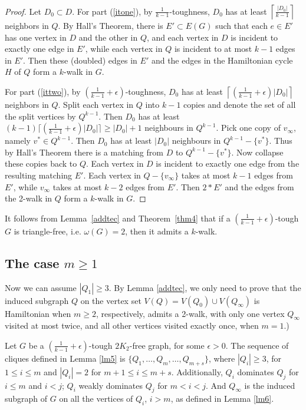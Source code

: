 \documentclass{amsart}
\theoremstyle{definition}
\begin{document}
\begin{proof}
Let $D_0\subset D$.
For part (\ref{itone}), 
by $\frac{1}{k-1}$-toughness, 
$D_0$ has at least $\left\lceil\frac{|D_0|}{k-1}\right\rceil$ neighbors in $Q$. By Hall's Theorem, 
there is $E'\subset E(G)$ such that each $e\in E'$ has one vertex in $D$ and the other in $Q$,
and each vertex in $D$ is incident to exactly one edge in $E'$, while each vertex in $Q$ is incident to at most $k-1$ edges in $E'$.
Then these ({doubled}) edges in $E'$ and the edges in the Hamiltonian cycle $H$ of $Q$ form a $k$-walk in $G$.

For part (\ref{ittwo}), by $\left(\frac{1}{k-1}+\epsilon\right)$-toughness, 
$D_0$ has at least $\left\lceil(\frac{1}{k-1}+\epsilon)|D_0|\right\rceil$ neighbors in $Q$. 
Split each vertex in $Q$ into $k-1$ copies and denote the set of all the split vertices by $Q^{k-1}$. 
Then $D_0$ has at least $(k-1)\lceil(\frac{1}{k-1}+\epsilon)|D_0|\rceil\ge|D_0|+1$ neighbours in $Q^{k-1}$. 
Pick one copy of $v_{\infty}$, namely $v^*\in Q^{k-1}$. Then $D_0$ has at least $|D_0|$ neighbours 
in $Q^{k-1}-\{v^*\}$. Thus by Hall's Theorem there is a matching from $D$ to $Q^{k-1}-\{v^*\}$. 
Now collapse these copies back to $Q$. Each vertex in $D$ is incident to exactly one edge from the resulting matching $E'$. 
Each vertex in $Q-\{v_{\infty}\}$ takes at most $k-1$ edges from $E'$,
while $v_{\infty}$ takes at most $k-2$ edges from $E'$. 
Then $2*E'$ and the edges from the 2-walk in $Q$ form a $k$-walk in $G$.
\end{proof}


It follows from Lemma~\ref{addtec} and Theorem~\ref{thm4} that
if a $(\frac{1}{k-1}+\epsilon)$-tough $G$ is triangle-free, i.e. $\omega(G)=2$, then 
it admits a $k$-walk.

\subsection{The case $m\ge1$} 
Now we can assume $|Q_1|\ge3$.
By Lemma \ref{addtec}, we only need to prove that the induced subgraph $Q$ on the vertex set $V(Q)=V(Q_0)\cup V(Q_{\infty})$ is Hamiltonian when $m\ge2$, 
respectively, admits a 2-walk, with only one vertex $Q_{\infty}$ visited at most twice, and all other vertices visited exactly once, when $m=1$.)

Let $G$ be a $(\frac{1}{k-1}+\epsilon)$-tough $2K_2$-free graph, for some $\epsilon>0$. The sequence of cliques defined in Lemma \ref{lm5} is $\{Q_1,\ldots,Q_m,\ldots,Q_{m+s}\}$, where $|Q_i|\ge3$, for $1\le i\le m$ and $|Q_i|=2$ for $m+1\le i\le m+s$. Additionally, $Q_i$ dominates $Q_j$ for $i\le m$ and $i<j$; $Q_i$ weakly dominates $Q_j$ for $m<i<j$. And $Q_{\infty}$ is the induced subgraph of $G$ on all the vertices of $Q_i$, $i>m$, as defined in Lemma \ref{lm6}. 
\end{document}
